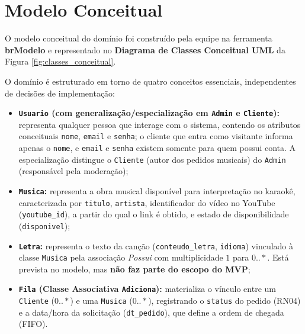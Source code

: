 \section{Modelo Conceitual}

O modelo conceitual do domínio foi construído pela equipe na ferramenta \textbf{brModelo} e representado no \textbf{Diagrama de Classes Conceitual UML} da Figura \ref{fig:classes_conceitual}.

O domínio é estruturado em torno de quatro conceitos essenciais, independentes de decisões de implementação:

\begin{itemize}
  \item \textbf{\texttt{Usuario} (com generalização/especialização em \texttt{Admin} e \texttt{Cliente}):} representa qualquer pessoa que interage com o sistema, contendo os atributos conceituais \texttt{nome}, \texttt{email} e \texttt{senha}; o cliente que entra como visitante informa apenas o \texttt{nome}, e \texttt{email} e \texttt{senha} existem somente para quem possui conta. A especialização distingue o \texttt{Cliente} (autor dos pedidos musicais) do \texttt{Admin} (responsável pela moderação);
  \item \textbf{\texttt{Musica}:} representa a obra musical disponível para interpretação no karaokê, caracterizada por \texttt{titulo}, \texttt{artista}, identificador do vídeo no YouTube (\texttt{youtube\_id}), a partir do qual o link é obtido, e estado de disponibilidade (\texttt{disponivel});
  \item \textbf{\texttt{Letra}:} representa o texto da canção (\texttt{conteudo\_letra}, \texttt{idioma}) vinculado à classe \texttt{Musica} pela associação \textit{Possui} com multiplicidade $1$ para $0..*$. Está prevista no modelo, mas \textbf{não faz parte do escopo do MVP};
  \item \textbf{\texttt{Fila} (Classe Associativa \texttt{Adiciona}):} materializa o vínculo entre um \texttt{Cliente} ($0..*$) e uma \texttt{Musica} ($0..*$), registrando o \texttt{status} do pedido (RN04) e a data/hora da solicitação (\texttt{dt\_pedido}), que define a ordem de chegada (FIFO).
\end{itemize}

